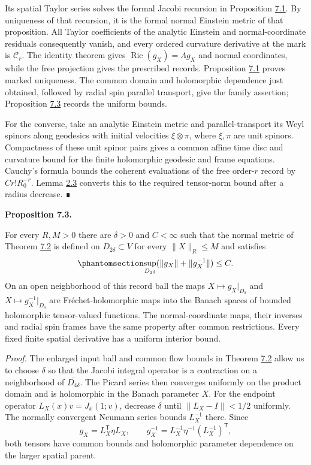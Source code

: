 \documentclass[
  english,
  11pt,
  reqno]{amsart}
\makeatletter
\newcommand{\pandocstatementheading}[1]{%
  \par\addpenalty{\@beginparpenalty}%
  \addvspace{.5\baselineskip plus .2\baselineskip minus .2\baselineskip}%
  {\normalfont\bfseries #1\par}%
  \nobreak\@afterindenttrue\@afterheading
}
\makeatother
\begin{document}
Its spatial Taylor series solves the formal Jacobi recursion in
Proposition \hyperref[prop:es-normal-uniqueness]{7.1}. By uniqueness of
that recursion, it is the formal normal Einstein metric of that
proposition. All Taylor coefficients of the analytic Einstein and
normal-coordinate residuals consequently vanish, and every ordered
curvature derivative at the mark is \(\mathcal C_r\). The identity
theorem gives \(\operatorname{Ric}(g_X)=\Lambda g_X\) and normal
coordinates, while the free projection gives the prescribed records.
Proposition \hyperref[prop:es-normal-uniqueness]{7.1} proves marked
uniqueness. The common domain and holomorphic dependence just obtained,
followed by radial spin parallel transport, give the family assertion;
Proposition \hyperref[prop:es-uniform-realization]{7.3} records the
uniform bounds.

For the converse, take an analytic Einstein metric and
parallel-transport its Weyl spinors along geodesics with initial
velocities \(\xi\otimes\pi\), where \(\xi,\pi\) are unit spinors.
Compactness of these unit spinor pairs gives a common affine time disc
and curvature bound for the finite holomorphic geodesic and frame
equations. Cauchy's formula bounds the coherent evaluations of the free
order-\(r\) record by \(Cr!R_0^{-r}\). Lemma
\hyperref[lem:es-record-growth]{2.3} converts this to the required
tensor-norm bound after a radius decrease. ∎

\pandocstatementheading{\protect{}\label{prop:es-uniform-realization}Proposition 7.3.}

For every \(R,M>0\) there are \(\delta>0\) and \(C<\infty\) such that
the normal metric of Theorem \hyperref[thm:es-realization]{7.2} is
defined on \(D_{2\delta}\subset V\) for every \(\|X\|_R\le M\) and
satisfies
\begin{equation}\protect\phantomsection\label{eq:es-uniform-metric-bound}{
 \sup_{D_{2\delta}}(\|g_X\|+\|g_X^{-1}\|)\le C.
}\end{equation} On an open neighborhood of this record ball the maps
\(X\mapsto g_X|_{D_\delta}\) and \(X\mapsto g_X^{-1}|_{D_\delta}\) are
Fréchet-holomorphic maps into the Banach spaces of bounded holomorphic
tensor-valued functions. The normal-coordinate maps, their inverses and
radial spin frames have the same property after common restrictions.
Every fixed finite spatial derivative has a uniform interior bound.

\emph{Proof.} The enlarged input ball and common flow bounds in Theorem
\hyperref[thm:es-realization]{7.2} allow us to choose \(\delta\) so that
the Jacobi integral operator is a contraction on a neighborhood of
\(\overline{D_{4\delta}}\). The Picard series then converges uniformly
on the product domain and is holomorphic in the Banach parameter \(X\).
For the endpoint operator \(L_X(x)v=J_x(1;v)\), decrease \(\delta\)
until \(\|L_X-I\|<1/2\) uniformly. The normally convergent Neumann
series bounds \(L_X^{-1}\) there. Since \[
 g_X=L_X^{\mathsf T}\eta L_X,\qquad
 g_X^{-1}=L_X^{-1}\eta^{-1}(L_X^{-1})^{\mathsf T},
\] both tensors have common bounds and holomorphic parameter dependence
on the larger spatial parent.
\end{document}
